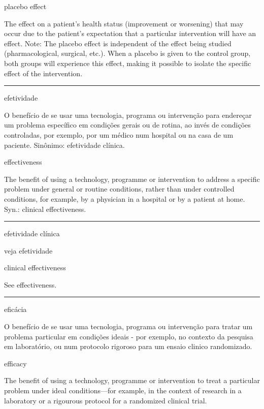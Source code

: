 \documentclass[
  openany]{book}
\begin{document}
placebo effect

The effect on a patient's health status (improvement or worsening) that may occur due to the patient's expectation that a particular intervention will have an effect. Note: The placebo effect is independent of the effect being studied (pharmacological, surgical, etc.). When a placebo is given to the control group, both groups will experience this effect, making it possible to isolate the specific effect of the intervention.

\begin{center}\rule{0.5\linewidth}{0.5pt}\end{center}

efetividade

O benefício de se usar uma tecnologia, programa ou intervenção para endereçar um problema específico em condições gerais ou de rotina, ao invés de condições controladas, por exemplo, por um médico num hospital ou na casa de um paciente. Sinônimo: efetividade clínica.

effectiveness

The benefit of using a technology, programme or intervention to address a specific problem under general or routine conditions, rather than under controlled conditions, for example, by a physician in a hospital or by a patient at home. Syn.: clinical effectiveness.

\begin{center}\rule{0.5\linewidth}{0.5pt}\end{center}

efetividade clínica

veja efetividade

clinical effectiveness

See effectiveness.

\begin{center}\rule{0.5\linewidth}{0.5pt}\end{center}

eficácia

O benefício de se usar uma tecnologia, programa ou intervenção para tratar um problema particular em condições ideais - por exemplo, no contexto da pesquisa em laboratório, ou num protocolo rigoroso para um ensaio clinico randomizado.

efficacy

The benefit of using a technology, programme or intervention to treat a particular problem under ideal conditions---for example, in the context of research in a laboratory or a rigourous protocol for a randomized clinical trial.
\end{document}
